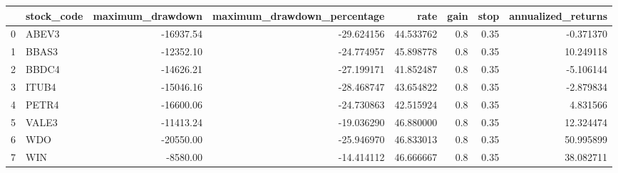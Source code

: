 \begin{tabular}{llrrrrrr}
\toprule
{} & stock\_code &  maximum\_drawdown &  maximum\_drawdown\_percentage &       rate &  gain &  stop &  annualized\_returns \\
\midrule
0 &      ABEV3 &         -16937.54 &                   -29.624156 &  44.533762 &   0.8 &  0.35 &           -0.371370 \\
1 &      BBAS3 &         -12352.10 &                   -24.774957 &  45.898778 &   0.8 &  0.35 &           10.249118 \\
2 &      BBDC4 &         -14626.21 &                   -27.199171 &  41.852487 &   0.8 &  0.35 &           -5.106144 \\
3 &      ITUB4 &         -15046.16 &                   -28.468747 &  43.654822 &   0.8 &  0.35 &           -2.879834 \\
4 &      PETR4 &         -16600.06 &                   -24.730863 &  42.515924 &   0.8 &  0.35 &            4.831566 \\
5 &      VALE3 &         -11413.24 &                   -19.036290 &  46.880000 &   0.8 &  0.35 &           12.324474 \\
6 &        WDO &         -20550.00 &                   -25.946970 &  46.833013 &   0.8 &  0.35 &           50.995899 \\
7 &        WIN &          -8580.00 &                   -14.414112 &  46.666667 &   0.8 &  0.35 &           38.082711 \\
\bottomrule
\end{tabular}
